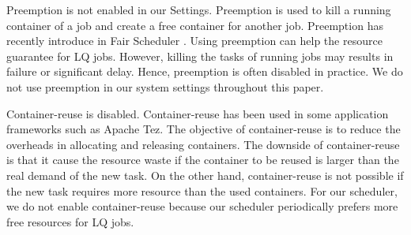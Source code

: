 Preemption is not enabled in our Settings. Preemption is used to kill a running container of a job and create a free container for another job. Preemption has recently introduce in Fair Scheduler \cite{hadoop-fair-scheduler}. Using preemption can help the resource guarantee for LQ jobs. However, killing the tasks of running jobs may results in failure or significant delay. Hence, preemption is often disabled in practice. We do not use preemption in our system settings throughout this paper.

Container-reuse is disabled. Container-reuse has been used in some application frameworks such as Apache Tez. The objective of container-reuse is to reduce the overheads in allocating and releasing containers. The downside of container-reuse is that it cause the resource waste if the container to be reused is larger than the real demand of the new task. On the other hand, container-reuse is not possible if the new task requires more resource than the used containers. For our scheduler, we do not enable container-reuse because our scheduler periodically prefers more free resources for LQ jobs.

